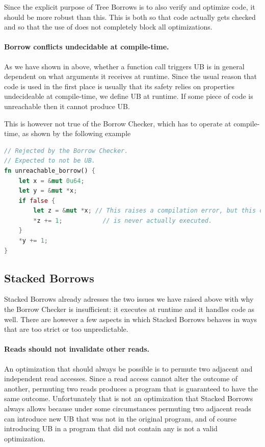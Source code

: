 \documentclass[a4paper,11pt]{article}
\theoremstyle{plain}
\theoremstyle{definition}
\theoremstyle{remark}
\newcommand{\tcode}[1]{\rstinline{#1}}
\begin{document}
Since the explicit purpose of Tree Borrows is to also verify and optimize
\tcode{unsafe} code, it should be more robust than this. This is both so that
\tcode{unsafe} code actually gets checked and so that the use of \tcode{unsafe}
does not completely block all optimizations.

\paragraph*{Borrow conflicts undecidable at compile-time.}
As we have shown in \tcode{example1} above, whether a function call triggers
UB is in general dependent on what arguments it receives at runtime. Since the
usual reason that \tcode{unsafe} code is used in the first place is usually
that its safety relies on properties undecideable at compile-time, we define
UB at runtime. If some piece of code is unreachable then it cannot produce UB.

This is however not true of the Borrow Checker, which has to operate at compile-time,
as shown by the following example
\begin{lstlisting}[language=rust]
// Rejected by the Borrow Checker.
// Expected to not be UB.
fn unreachable_borrow() {
    let x = &mut 0u64;
    let y = &mut *x;
    if false {
        let z = &mut *x; // This raises a compilation error, but this code
        *z += 1;           // is never actually executed.
    }
    *y += 1;
}
\end{lstlisting}

\subsection{Stacked Borrows}

Stacked Borrows already adresses the two issues we have raised above with
why the Borrow Checker is insufficient: it executes at runtime and it handles
\tcode{unsafe} code as well. There are however a few aspects in which
Stacked Borrows behaves in ways that are too strict or too unpredictable.

\paragraph*{Reads should not invalidate other reads.}
An optimization that should always be possible is to permute two adjacent and independent
read accesses. Since a read access cannot alter the outcome of another, permuting
two reads produces a program that is guaranteed to have the same outcome.
Unfortunately that is not an optimization that Stacked Borrows always allows
because under some circumstances permuting two adjacent reads can introduce new
UB that was not in the original program, and of course introducing UB in a program
that did not contain any is not a valid optimization.
\end{document}
